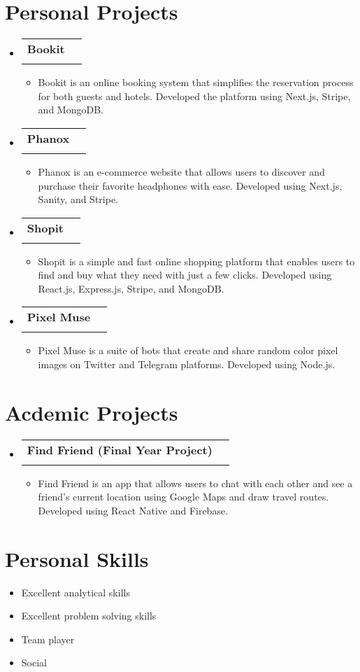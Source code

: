 \documentclass[letterpaper,11pt]{article}
\makeatletter
\newcommand{\resumeItem}[1]{
  \item\small{
    {#1 \vspace{-2pt}}
  }
}
\newcommand{\resumeSubheading}[4]{
  \vspace{-1pt}\item
    \begin{tabular*}{0.97\textwidth}[t]{l@{\extracolsep{\fill}}r}
      \textbf{#1} & #2 \\
      \textit{\small#3} & \textit{\small #4} \\
    \end{tabular*}\vspace{-6pt}
}
\newcommand{\resumeSubHeadingListStart}{\begin{itemize}[leftmargin=0.15in, label={}]}
\newcommand{\resumeSubHeadingListEnd}{\end{itemize}}
\newcommand{\resumeItemListStart}{\begin{itemize}}
\newcommand{\resumeItemListEnd}{\end{itemize}\vspace{-4pt}}
\makeatother
\begin{document}
\section{Personal Projects}
  \resumeSubHeadingListStart
      \resumeSubheading
      {Bookit}{}{}{}\vspace{-12pt}
      \resumeItemListStart
        \resumeItem{Bookit is an online booking system that simplifies the reservation process for both guests and hotels. Developed the platform using Next.js, Stripe, and MongoDB.}
    \resumeItemListEnd
    \resumeSubheading
    {Phanox}{}{}{}\vspace{-12pt}
      \resumeItemListStart
        \resumeItem{Phanox is an e-commerce website that allows users to discover and purchase their favorite headphones with ease. Developed using Next.js, Sanity, and Stripe.}
    \resumeItemListEnd
    \resumeSubheading
    {Shopit}{}{}{}\vspace{-12pt}
      \resumeItemListStart
        \resumeItem{Shopit is a simple and fast online shopping platform that enables users to find and buy what they need with just a few clicks. Developed using React.js, Express.js, Stripe, and MongoDB.}
    \resumeItemListEnd
    \resumeSubheading
    {Pixel Muse}{}{}{}\vspace{-12pt}
      \resumeItemListStart
        \resumeItem{Pixel Muse is a suite of bots that create and share random color pixel images on Twitter and Telegram platforms. Developed using Node.js.}
    \resumeItemListEnd
  \resumeSubHeadingListEnd

\section{Acdemic Projects}
  \resumeSubHeadingListStart
      \resumeSubheading
      {Find Friend (Final Year Project)}{}{}{}\vspace{-12pt}
      \resumeItemListStart
        \resumeItem{Find Friend is an app that allows users to chat with each other and see a friend’s current location using Google Maps and draw travel routes. Developed using React Native and Firebase.}
    \resumeItemListEnd
  \resumeSubHeadingListEnd

\section{Personal Skills}
      \resumeItemListStart
        \resumeItem{Excellent analytical skills}
        \resumeItem{Excellent problem solving skills}
        \resumeItem{Team player}
        \resumeItem{Social}\vspace{-10pt}
    \resumeItemListEnd
\end{document}
